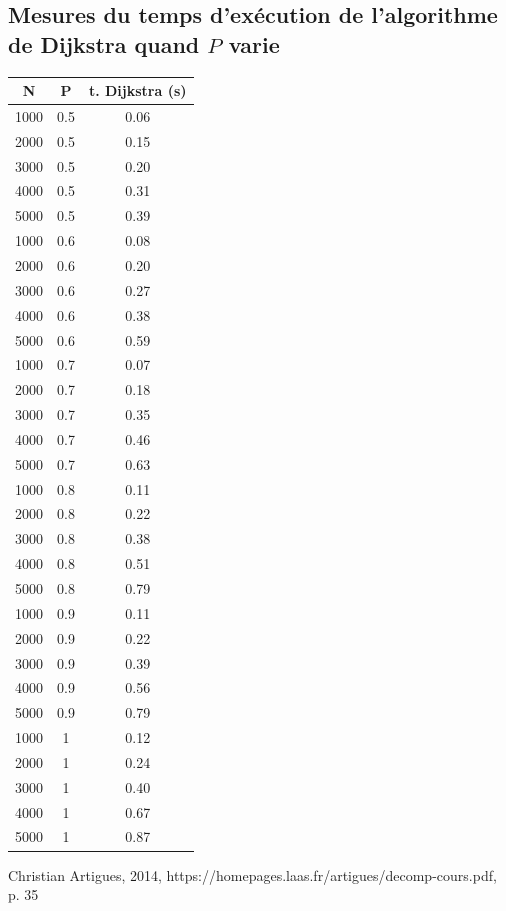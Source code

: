\documentclass{article}
\begin{document}
\begin{appendices}
\subsection{Mesures du temps d'exécution de l'algorithme de Dijkstra quand $P$ varie}
\begin{table}[h]
    \centering
    \begin{tabular}{c|c|c}
    N & P & t. Dijkstra (s)\\ \hline
    1000 & 0.5 & 0.06 \\
    2000 & 0.5 & 0.15 \\
    3000 & 0.5 & 0.20 \\
    4000 & 0.5 & 0.31 \\
    5000 & 0.5 & 0.39 \\
    1000 & 0.6 & 0.08 \\
    2000 & 0.6 & 0.20 \\
    3000 & 0.6 & 0.27 \\
    4000 & 0.6 & 0.38 \\
    5000 & 0.6 & 0.59 \\
    1000 & 0.7 & 0.07 \\
    2000 & 0.7 & 0.18 \\
    3000 & 0.7 & 0.35 \\
    4000 & 0.7 & 0.46 \\
    5000 & 0.7 & 0.63 \\
    1000 & 0.8 & 0.11 \\
    2000 & 0.8 & 0.22 \\
    3000 & 0.8 & 0.38 \\
    4000 & 0.8 & 0.51 \\
    5000 & 0.8 & 0.79 \\
    1000 & 0.9 & 0.11 \\
    2000 & 0.9 & 0.22 \\
    3000 & 0.9 & 0.39 \\
    4000 & 0.9 & 0.56 \\
    5000 & 0.9 & 0.79 \\
    1000 & 1 & 0.12 \\
    2000 & 1 & 0.24 \\
    3000 & 1 & 0.40 \\
    4000 & 1 & 0.67 \\
    5000 & 1 & 0.87
    \end{tabular}
\end{table}
\begin{thebibliography}{2}
 Christian Artigues, 2014, https://homepages.laas.fr/artigues/decomp-cours.pdf, p. 35
\end{thebibliography}
\end{appendices}
\end{document}
